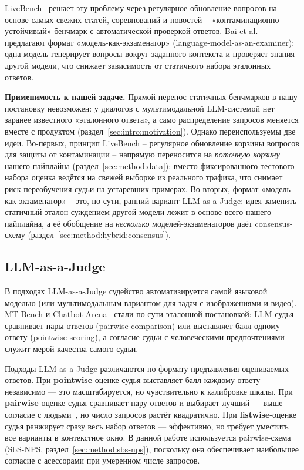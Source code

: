 LiveBench~\cite{white2024livebench} решает эту проблему через
регулярное обновление вопросов на основе самых свежих статей,
соревнований и новостей -- «контаминационно-устойчивый» бенчмарк с
автоматической проверкой ответов.
Bai et al.~\cite{bai2023benchmarking} предлагают формат
«модель-как-экзаменатор» (language-model-as-an-examiner): одна модель
генерирует вопросы вокруг заданного контекста и проверяет знания
другой модели, что снижает зависимость от статичного набора эталонных
ответов.

\textbf{Применимость к нашей задаче.}
Прямой перенос статичных бенчмарков в нашу постановку невозможен: у
диалогов с мультимодальной LLM-системой нет заранее известного
«эталонного ответа», а само распределение запросов меняется вместе с
продуктом (раздел~\ref{sec:intro:motivation}).
Однако переиспользуемы две идеи.
Во-первых, принцип LiveBench -- регулярное обновление корзины вопросов
для защиты от контаминации -- напрямую переносится на \emph{поточную
корзину} нашего пайплайна (раздел~\ref{sec:method:data}): вместо
фиксированного тестового набора оценка ведётся на свежей выборке из
реального трафика, что снимает риск переобучения судьи на устаревших
примерах.
Во-вторых, формат «модель-как-экзаменатор» -- это, по сути, ранний
вариант LLM-as-a-Judge: идея заменить статичный эталон суждением другой
модели лежит в основе всего нашего пайплайна, а её обобщение на
\emph{несколько} моделей-экзаменаторов даёт consensus-схему
(раздел~\ref{sec:method:hybrid:consensus}).

\subsection{LLM-as-a-Judge}

В подходах LLM-as-a-Judge судейство автоматизируется самой языковой
моделью (или мультимодальным вариантом для задач с изображениями и
видео).
MT-Bench и Chatbot Arena~\cite{zheng2023mtbench} стали по сути
эталонной постановкой: LLM-судья сравнивает пары ответов
(pairwise comparison) или выставляет балл одному ответу
(pointwise scoring), а согласие судьи с человеческими предпочтениями
служит мерой качества самого судьи.

Подходы LLM-as-a-Judge различаются по формату предъявления оцениваемых ответов. При \textbf{pointwise}-оценке судья выставляет балл каждому ответу независимо — это масштабируется, но чувствительно к калибровке шкалы. При \textbf{pairwise}-оценке судья сравнивает пару ответов и выбирает лучший — выше согласие с людьми~\cite{zheng2023mtbench}, но число запросов растёт квадратично. При \textbf{listwise}-оценке судья ранжирует сразу весь набор ответов — эффективно, но требует уместить все варианты в контекстное окно. В данной работе используется pairwise-схема (SbS-NPS, раздел~\ref{sec:method:sbs-nps}), поскольку она обеспечивает наибольшее согласие с асессорами при умеренном числе запросов.

